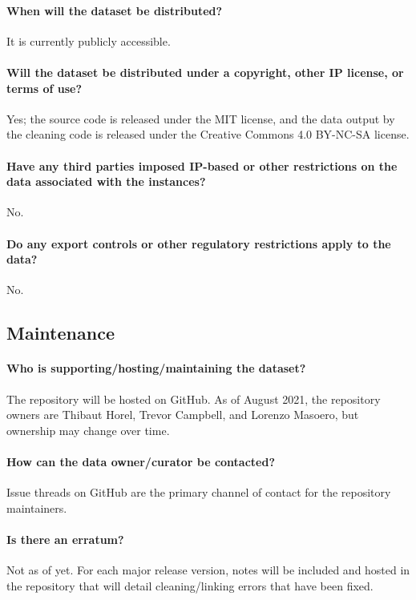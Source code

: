 \paragraph{When will the dataset be distributed?}
It is currently publicly accessible.

\paragraph{Will the dataset be distributed under a copyright, other IP license, or terms of use?}
Yes; the source code is released under the MIT license, and the data output by the cleaning code is released under the Creative Commons 4.0 BY-NC-SA license.

\paragraph{Have any third parties imposed IP-based or other restrictions on the data associated with the instances?}
No.

\paragraph{Do any export controls or other regulatory restrictions apply to the data?}
No.

\subsection{Maintenance}

\paragraph{Who is supporting/hosting/maintaining the dataset?}
The repository will be hosted on GitHub. As of August 2021, the repository
owners are Thibaut Horel, Trevor Campbell, and Lorenzo Masoero, but ownership
may change over time.

\paragraph{How can the data owner/curator be contacted?}
Issue threads on GitHub are the primary channel of contact for the repository maintainers.

\paragraph{Is there an erratum?}
Not as of yet. For each major release version, notes will be included and
hosted in the repository that will detail cleaning/linking errors that have been fixed.

